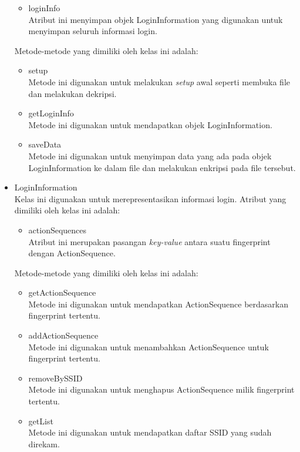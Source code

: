\begin{itemize}
{\begin{itemize}
            \item{loginInfo\\Atribut ini menyimpan objek LoginInformation yang digunakan untuk menyimpan seluruh informasi login.}
        \end{itemize}
        Metode-metode yang dimiliki oleh kelas ini adalah:
        \begin{itemize}
            \item{setup\\Metode ini digunakan untuk melakukan \textit{setup} awal seperti membuka file dan melakukan dekripsi.}
            \item{getLoginInfo\\Metode ini digunakan untuk mendapatkan objek LoginInformation.}
            \item{saveData\\Metode ini digunakan untuk menyimpan data yang ada pada objek LoginInformation ke dalam file dan melakukan enkripsi pada file tersebut.}
        \end{itemize}
    }
    \item{
        LoginInformation\\Kelas ini digunakan untuk merepresentasikan informasi login. Atribut yang dimiliki oleh kelas ini adalah:
        \begin{itemize}
            \item{actionSequences\\Atribut ini merupakan pasangan \textit{key-value} antara suatu fingerprint dengan ActionSequence.}
        \end{itemize}
        Metode-metode yang dimiliki oleh kelas ini adalah:
        \begin{itemize}
            \item{getActionSequence\\Metode ini digunakan untuk mendapatkan ActionSequence berdasarkan fingerprint tertentu.}
            \item{addActionSequence\\Metode ini digunakan untuk menambahkan ActionSequence untuk fingerprint tertentu.}
            \item{removeBySSID\\Metode ini digunakan untuk menghapus ActionSequence milik fingerprint tertentu.}
            \item{getList\\Metode ini digunakan untuk mendapatkan daftar SSID yang sudah direkam.}
        \end{itemize}
}
\end{itemize}
